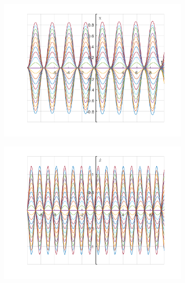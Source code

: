 \documentclass{article}
\begin{document}
	\begin{figure}[h!]
		\graphicspath{{./SmallOscillations/S1} }
		\centering
		\begin{subfigure}[b]{0.48\linewidth}
			\includegraphics[width=\linewidth]{./SmallOscillations/S2/F3.png}
		\end{subfigure}
		\begin{subfigure}[b]{0.48\linewidth}
			\includegraphics[width=\linewidth]{./SmallOscillations/S2/F4.png}
		\end{subfigure}
	\end{figure}
	
\end{document}
